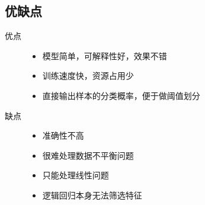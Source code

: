 \documentclass[letterpaper,10pt,english]{sphinxmanual}
\begin{document}
\subsection{优缺点}
\label{\detokenize{machineLearning/01_lr:id3}}\begin{description}
\item[{优点}] \leavevmode\begin{itemize}
\item {} 
模型简单，可解释性好，效果不错

\item {} 
训练速度快，资源占用少

\item {} 
直接输出样本的分类概率，便于做阈值划分

\end{itemize}

\item[{缺点}] \leavevmode\begin{itemize}
\item {} 
准确性不高

\item {} 
很难处理数据不平衡问题

\item {} 
只能处理线性问题

\item {} 
逻辑回归本身无法筛选特征

\end{itemize}

\end{description}
\end{document}
